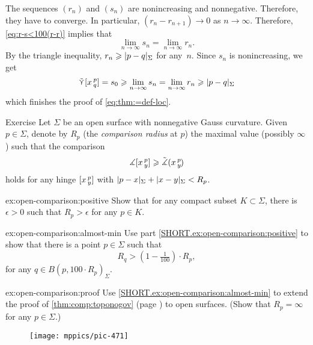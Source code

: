 The sequences $(r_n)$ and $(s_n)$ are nonincreasing and nonnegative.
Therefore, they have to converge.
In particular, $(r_n-r_{n+1})\to0$ as $n\to \infty$.
Therefore, \ref{eq:r-s<100(r-r)} implies that
\[\lim_{n\to\infty}s_n=\lim_{n\to\infty}r_n.\]
By the triangle inequality, $r_n\ge \dist{p}{q}\Sigma$ for any~$n$.
Since $s_n$ is nonincreasing, we get
\[\side \hinge{x}p q=s_0\ge \lim_{n\to\infty}s_n=\lim_{n\to\infty}r_n\ge \dist{p}{q}\Sigma\]
which finishes the proof of \ref{eq:thm:=def-loc}.
\qeds

\begin{thm}{Exercise}\label{ex:open-comparison}
Let $\Sigma$ be an open surface with nonnegative Gauss curvature.
Given $p\in\Sigma$, denote by $R_p$ 
(the {}\emph{comparison radius} at $p$) 
the maximal value (possibly $\infty$) such that the comparison 
\[\measuredangle[x\,{}^{p}_{y}]
\geqslant\tilde\measuredangle(x\,{}^{p}_{y}\hspace{-0.2ex})\]
holds for any hinge $[x\,{}^{p}_{y}]$ with $\dist{p}{x}\Sigma+\dist{x}{y}\Sigma<R_p$.

\begin{subthm}{ex:open-comparison:positive}
Show that for any compact subset $K\subset \Sigma$, there is $\epsilon>0$ such that $R_p>\epsilon$ for any $p\in K$.
\end{subthm}

\begin{subthm}{ex:open-comparison:almost-min}
Use part \ref{SHORT.ex:open-comparison:positive} to show that 
there is a point $p\in\Sigma$ such that 
\[R_q>(1-\tfrac1{100})\cdot R_p,\]
for any $q\in B(p,100\cdot R_p)_\Sigma$.
\end{subthm}

\begin{subthm}{ex:open-comparison:proof}
Use \ref{SHORT.ex:open-comparison:almost-min} to extend the proof of \ref{thm:comp:toponogov} (page \pageref{proof(thm:comp:toponogov)}) to open surfaces. 
(Show that $R_p=\infty$ for any $p\in\Sigma$.) 
\end{subthm}

\end{thm}

\begin{wrapfigure}[4]{r}{30 mm}
\vskip-7mm
\centering
\texttt{[image: mppics/pic-471]}
\end{wrapfigure}

